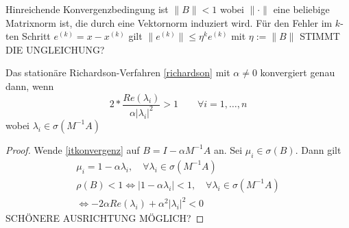 Hinreichende Konvergenzbedingung ist $\|B\| <1$ wobei $\|\cdot \|$ eine beliebige Matrixnorm ist, die durch eine Vektornorm induziert wird.
Für den Fehler im $k$-ten Schritt $e^{(k)} = x-x^{(k)}$ gilt $\|e^{(k)}\| \leq \eta^k e^{(k)}$ mit $\eta := \|B\|$ STIMMT DIE UNGLEICHUNG?

\begin{satz}
  Das stationäre Richardson-Verfahren \eqref{richardson} mit $\alpha \neq 0$ konvergiert genau dann, wenn 
  \begin{equation}
    2* \frac{Re(\lambda_i)}{\alpha|\lambda_i|^2} > 1 \qquad \forall i=1,\dots, n
    \label{}
  \end{equation}
  wobei $\lambda_i \in \sigma(M^{-1}A)$
\end{satz}

\begin{proof}
  Wende \eqref{itkonvergenz} auf $B=I-\alpha M^{-1}A$ an. Sei $\mu_i \in \sigma(B)$. Dann gilt
  \begin{equation*}
    \begin{split}
      \mu_i = 1-\alpha \lambda_i, \quad \forall \lambda_i \in \sigma(M^{-1}A)\\
      \rho(B) < 1 \Leftrightarrow |1-\alpha\lambda_i| <1, \quad \forall \lambda_i \in \sigma(M^{-1}A)\\
      \Leftrightarrow -2 \alpha Re(\lambda_i) + \alpha^2 |\lambda_i|^2 <0
    \end{split}
  \end{equation*}
  SCHÖNERE AUSRICHTUNG MÖGLICH?
\end{proof}


